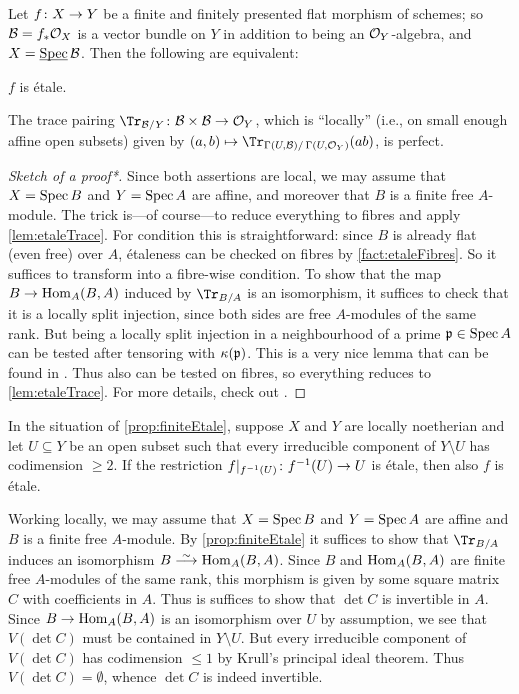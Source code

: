 \begin{prop}\label{prop:finiteEtale}
	Let $f\colon X\morphism Y$ be a finite and finitely presented flat morphism of schemes; so $\mathcal{B}=f_*\mathcal{O}_X$ is a vector bundle on $Y$ in addition to being an $\mathcal{O}_Y$-algebra, and $X=\operatorname{\underline{\smash{\mathrm{Spec}}}} \mathcal{B}$. Then the following are equivalent:
	\begin{alphanumerate}
		\item $f$ is étale.
		\item The trace pairing $\Tr_{\Bb/Y}\colon \Bb\times\Bb\morphism\Oo_Y$, which is \enquote{locally} (i.e., on small enough affine open subsets)  given by $(a,b)\mapsto \Tr_{\Global(U,\Bb)/\Global(U,\Oo_Y)}(ab)$, is perfect.
	\end{alphanumerate}
\end{prop}
\begin{proof}[Sketch of a proof\textup{*}]
	Since both assertions are local, we may assume that $X=\operatorname{Spec} B$ and $Y=\operatorname{Spec} A$ are affine, and moreover that $B$ is a finite free $A$-module. The trick is---of course---to reduce everything to fibres and apply \cref{lem:etaleTrace}. For condition  this is straightforward: since $B$ is already flat (even free) over $A$, étaleness can be checked on fibres by \cref{fact:etaleFibres}. So it suffices to transform  into a fibre-wise condition. To show that the map $B\morphism\Hom_A(B,A)$ induced by $\Tr_{B/A}$ is an isomorphism, it suffices to check that it is a locally split injection, since both sides are free $A$-modules of the same rank. But being a locally split injection in a neighbourhood of a prime $\mathfrak{p}\in\operatorname{Spec} A$ can be tested after tensoring with $\kappa(\mathfrak{p})$. This is a very nice lemma that can be found in \cite[Ch. (19.1.12)]{egaIV1}. Thus also  can be tested on fibres, so everything reduces to \cref{lem:etaleTrace}. For more details, check out \cite[Proposition~2.7.2]{jacobians}.
\end{proof}
\begin{cor}\label{cor:etaleCodim2}
	In the situation of \cref{prop:finiteEtale}, suppose $X$ and $Y$ are locally noetherian and let $U\subseteq Y$ be an open subset such that every irreducible component of $Y\setminus U$ has codimension $\geq 2$. If the restriction $f|_{f^{-1}(U)}\colon f^{-1}(U)\morphism U$ is étale, then also $f$ is étale.
\end{cor}
\begin{proof*}
	Working locally, we may assume that $X=\operatorname{Spec} B$ and $Y=\operatorname{Spec} A$ are affine and $B$ is a finite free $A$-module. By \cref{prop:finiteEtale} it suffices to show that $\Tr_{B/A}$ induces an isomorphism $B\isomorphism \Hom_A(B,A)$. Since $B$ and $\operatorname{Hom}_A(B,A)$ are finite free $A$-modules of the same rank, this morphism is given by some square matrix $C$ with coefficients in $A$. Thus is suffices to show that $\det C$ is invertible in $A$. Since $B\morphism\Hom_A(B,A)$ is an isomorphism over $U$ by assumption, we see that $V(\det C)$ must be contained in $Y\setminus U$. But every irreducible component of $V(\det C)$ has codimension $\leq 1$ by Krull's principal ideal theorem. Thus $V(\det C)=\emptyset$, whence $\det C$ is indeed invertible.
\end{proof*}
